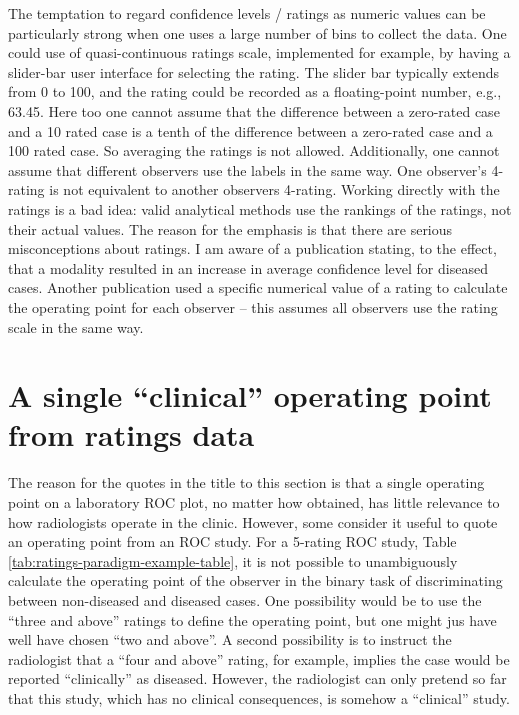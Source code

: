 \documentclass[
]{book}
\begin{document}
The temptation to regard confidence levels / ratings as numeric values can be particularly strong when one uses a large number of bins to collect the data. One could use of quasi-continuous ratings scale, implemented for example, by having a slider-bar user interface for selecting the rating. The slider bar typically extends from 0 to 100, and the rating could be recorded as a floating-point number, e.g., 63.45. Here too one cannot assume that the difference between a zero-rated case and a 10 rated case is a tenth of the difference between a zero-rated case and a 100 rated case. So averaging the ratings is not allowed. Additionally, one cannot assume that different observers use the labels in the same way. One observer's 4-rating is not equivalent to another observers 4-rating. Working directly with the ratings is a bad idea: valid analytical methods use the rankings of the ratings, not their actual values. The reason for the emphasis is that there are serious misconceptions about ratings. I am aware of a publication stating, to the effect, that a modality resulted in an increase in average confidence level for diseased cases. Another publication used a specific numerical value of a rating to calculate the operating point for each observer -- this assumes all observers use the rating scale in the same way.

\hypertarget{binary-task-clinical-operating-point}{%
\section{A single ``clinical'' operating point from ratings data}\label{binary-task-clinical-operating-point}}

The reason for the quotes in the title to this section is that a single operating point on a laboratory ROC plot, no matter how obtained, has little relevance to how radiologists operate in the clinic. However, some consider it useful to quote an operating point from an ROC study. For a 5-rating ROC study, Table \ref{tab:ratings-paradigm-example-table}, it is not possible to unambiguously calculate the operating point of the observer in the binary task of discriminating between non-diseased and diseased cases. One possibility would be to use the ``three and above'' ratings to define the operating point, but one might jus have well have chosen ``two and above''. A second possibility is to instruct the radiologist that a ``four and above'' rating, for example, implies the case would be reported ``clinically'' as diseased. However, the radiologist can only pretend so far that this study, which has no clinical consequences, is somehow a ``clinical'' study.
\end{document}
